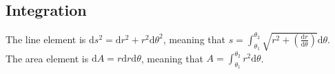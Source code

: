 \subsection{Integration}
\noindent
The line element is $\mathrm{d}s^2=\mathrm{d}r^2+r^2\mathrm{d}\theta^2$, meaning that $s=\int_{\theta_1}^{\theta_2}{\sqrt{r^2+\left(\frac{\mathrm{d}r}{\mathrm{d}\theta}\right)}\mathrm{d}\theta}$.\\
The area element is $\mathrm{d}A=r\mathrm{d}r\mathrm{d}\theta$, meaning that $A=\int_{\theta_1}^{\theta_2}{r^2\mathrm{d}\theta}$.

